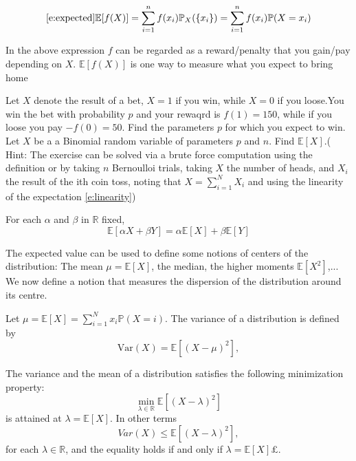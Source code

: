 	\begin{definition}
	\begin{equation}
		\eqref{e:expected}
		\mathbb E[f(X)] = \sum_{i = 1 }^n f(x_i) \mathbb P_X(\{x_i\}) = \sum_{i = 1}^n f(x_i) \mathbb P(X = x_i)
		\end{equation}
	\end{definition}
	In the above expression $f$ can be regarded as a reward/penalty that you gain/pay depending on $X$. $\mathbb E[f(X)]$ is one way to measure what you expect to bring home
	\begin{ExerciseList}
		\Exercise Let $X$ denote the result of a bet, $X = 1$ if you win, while $X = 0$ if you loose.You win the bet with probability $p$ and your rewaqrd is $f(1) = 150$, while if you loose you pay $-f(0) = 50$. Find the parameters $p$ for which you expect to win. 
		\Exercise Let $X$ be a a Binomial random variable of parameters $p$ and $n$. Find $\mathbb E[X]$.( Hint: The exercise can be solved via a brute force computation using the definition or by taking $n$ Bernoulloi trials, taking $X$ the number of heads, and $X_i$ the result of the ith coin toss, noting that $X = \sum_{i = 1}^N  X_i$ and using the linearity of the expectation \eqref{e:linearity})
	\end{ExerciseList} 
	\begin{theorem}
		For each $\alpha$ and $\beta$ in $\mathbb R$ fixed, 
	\begin{equation}
		\mathbb E[ \alpha X  +\beta Y ] = \alpha \mathbb E[X] + \beta \mathbb E[Y]
	\end{equation}
	\end{theorem}
	The expected value can be used to define some notions of centers of the distribution: The mean $\mu = \mathbb E[X]$, the median, the higher moments $\mathbb E[X^2]$,...
	We now define a notion that measures the dispersion of the distribution around its centre. 
	\begin{definition}[Variance]
		\label{d:variance}
		Let $\mu = \mathbb E[X] = \sum_{i =1}^N x_i \mathbb P(X = i)$. The variance of a distribution is defined by 
		\begin{equation}
				\text{Var}(X) = \mathbb E [(X-\mu)^2],
		\end{equation}
	\end{definition}
	\begin{theorem}
		\label{t:projection}
		The variance and the mean of a distribution satisfies the following minimization property:  
		\begin{equation}
		\min_{\lambda \in \mathbb R } \mathbb E[(X - \lambda)^2]
		\end{equation}
		is attained at $\lambda = \mathbb E[X]$. In other terms	
		\begin{equation}
			\label{e:projection_inequality}
		Var(X) \leq  \mathbb E[ (X - \lambda )^2],		
		\end{equation} 
	for each $\lambda \in \mathbb R$, and the equality holds if and only if $\lambda = \mathbb E[X]£$. 
	\end{theorem}

